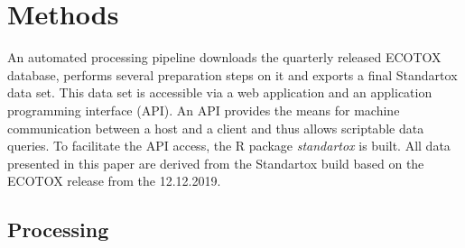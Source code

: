 \section{Methods}
An automated processing pipeline downloads the quarterly released ECOTOX database, performs several preparation steps on it and exports a final Standartox data set. This data set is accessible via a web application and an application programming interface (API). An API provides the means for machine communication between a host and a client and thus allows scriptable data queries. To facilitate the API access, the R \citep{rcoreteam_language_2017} package \textit{standartox} is built. All data presented in this paper are derived from the Standartox build based on the ECOTOX release from the 12.12.2019.

\subsection{Processing}
